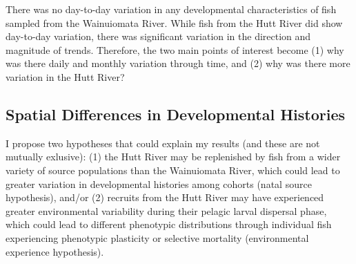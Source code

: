 \documentclass[]{book}
\begin{document}
There was no day-to-day variation in any developmental characteristics
of fish sampled from the Wainuiomata River. While fish from the Hutt
River did show day-to-day variation, there was significant variation in
the direction and magnitude of trends. Therefore, the two main points of
interest become (1) why was there daily and monthly variation through
time, and (2) why was there more variation in the Hutt River?

\subsection{Spatial Differences in Developmental
Histories}\label{spatial-differences-in-developmental-histories}

I propose two hypotheses that could explain my results (and these are
not mutually exlusive): (1) the Hutt River may be replenished by fish
from a wider variety of source populations than the Wainuiomata River,
which could lead to greater variation in developmental histories among
cohorts (natal source hypothesis), and/or (2) recruits from the Hutt
River may have experienced greater environmental variability during
their pelagic larval dispersal phase, which could lead to different
phenotypic distributions through individual fish experiencing phenotypic
plasticity or selective mortality (environmental experience hypothesis).
\end{document}
